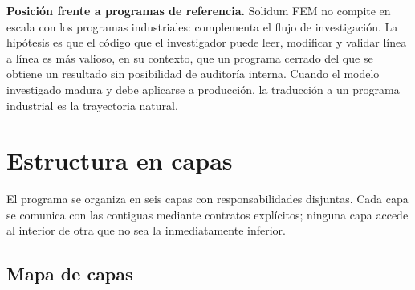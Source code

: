 \documentclass[11pt,oneside]{report}
\begin{document}
\textbf{Posición frente a programas de referencia.} Solidum FEM no compite en escala con los programas industriales: complementa el flujo de investigación. La hipótesis es que el código que el investigador puede leer, modificar y validar línea a línea es más valioso, en su contexto, que un programa cerrado del que se obtiene un resultado sin posibilidad de auditoría interna. Cuando el modelo investigado madura y debe aplicarse a producción, la traducción a un programa industrial es la trayectoria natural.


\newpage

\chapter{Estructura en capas}
\label{cap:2}



El programa se organiza en seis capas con responsabilidades disjuntas. Cada capa se comunica con las contiguas mediante contratos explícitos; ninguna capa accede al interior de otra que no sea la inmediatamente inferior.

\section{Mapa de capas}
\end{document}
